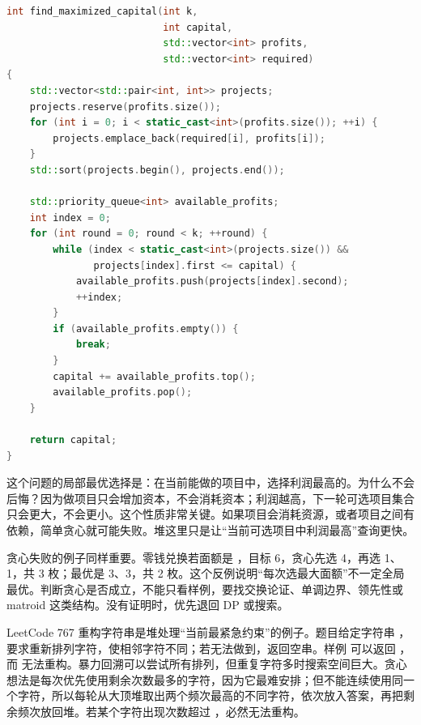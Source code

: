 \begin{lstlisting}[language=C++,caption={LeetCode 502 IPO：按资本解锁项目，用利润堆选择}]
int find_maximized_capital(int k,
                           int capital,
                           std::vector<int> profits,
                           std::vector<int> required)
{
    std::vector<std::pair<int, int>> projects;
    projects.reserve(profits.size());
    for (int i = 0; i < static_cast<int>(profits.size()); ++i) {
        projects.emplace_back(required[i], profits[i]);
    }
    std::sort(projects.begin(), projects.end());

    std::priority_queue<int> available_profits;
    int index = 0;
    for (int round = 0; round < k; ++round) {
        while (index < static_cast<int>(projects.size()) &&
               projects[index].first <= capital) {
            available_profits.push(projects[index].second);
            ++index;
        }
        if (available_profits.empty()) {
            break;
        }
        capital += available_profits.top();
        available_profits.pop();
    }

    return capital;
}
\end{lstlisting}

这个问题的局部最优选择是：在当前能做的项目中，选择利润最高的。为什么不会后悔？因为做项目只会增加资本，不会消耗资本；利润越高，下一轮可选项目集合只会更大，不会更小。这个性质非常关键。如果项目会消耗资源，或者项目之间有依赖，简单贪心就可能失败。堆这里只是让“当前可选项目中利润最高”查询更快。

贪心失败的例子同样重要。零钱兑换若面额是 ，目标 6，贪心先选 4，再选 1、1，共 3 枚；最优是 3、3，共 2 枚。这个反例说明“每次选最大面额”不一定全局最优。判断贪心是否成立，不能只看样例，要找交换论证、单调边界、领先性或 matroid 这类结构。没有证明时，优先退回 DP 或搜索。

LeetCode 767 重构字符串是堆处理“当前最紧急约束”的例子。题目给定字符串 ，要求重新排列字符，使相邻字符不同；若无法做到，返回空串。样例  可以返回 ，而  无法重构。暴力回溯可以尝试所有排列，但重复字符多时搜索空间巨大。贪心想法是每次优先使用剩余次数最多的字符，因为它最难安排；但不能连续使用同一个字符，所以每轮从大顶堆取出两个频次最高的不同字符，依次放入答案，再把剩余频次放回堆。若某个字符出现次数超过 ，必然无法重构。


